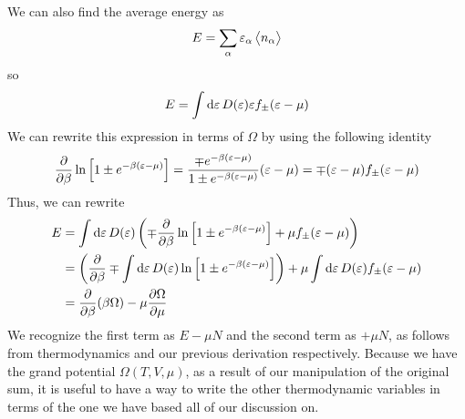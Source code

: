 We can also find the average energy as
\[E = \sum_{\alpha}\varepsilon_\alpha\left\langle \begin{matrix}n_\alpha\end{matrix} \right\rangle\]
so
\begin{equation}
	E =\int\d{\varepsilon}D(\varepsilon)\varepsilon f_\pm (\varepsilon-\mu)
\end{equation}
We can rewrite this expression in terms of \(\Omega\) by using the following identity
\begin{equation}
	\frac{\partial }{\partial \beta}\ln \left[1\pm e^{-\beta(\varepsilon-\mu)}\right] = \frac{\mp e^{-\beta(\varepsilon-\mu)}}{1\pm e^{-\beta(\varepsilon-\mu)}}(\varepsilon-\mu) = \mp(\varepsilon-\mu) f_\pm(\varepsilon-\mu)
\end{equation}
Thus, we can rewrite
\begin{align}
	E&=\int\d{\varepsilon}D(\varepsilon)\left(\mp \pder{}{\beta}\ln\left[1\pm e^{-\beta(\varepsilon-\mu)}\right]+\mu f_\pm(\varepsilon-\mu)\right)\nonumber\\
	 &=\left( \pder{}{\beta}\mp\int\d{\varepsilon}D(\varepsilon)\ln\left[1\pm e^{-\beta(\varepsilon-\mu)}\right]\right) + \mu\int\d{\varepsilon}D(\varepsilon)f_\pm(\varepsilon-\mu)\nonumber\\
	 &=\pder{}{\beta}(\beta\Omega) -\mu\pder{\Omega}{\mu}
\end{align}
We recognize the first term as \(E-\mu N\) and the second term as \(+\mu N\), as follows from thermodynamics and our previous derivation respectively. Because we have the grand potential \(\Omega(T,V,\mu)\), as a result of our manipulation of the original sum, it is useful to have a way to write the other thermodynamic variables in terms of the one we have based all of our discussion on.

